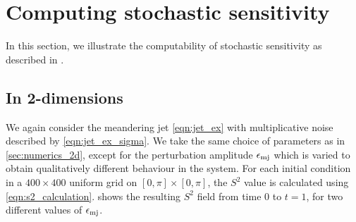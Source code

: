 \section{Computing stochastic sensitivity} \label{sec:comput_s2}
In this section, we illustrate the computability of stochastic sensitivity as described in .

\subsection{In 2-dimensions}
We again consider the meandering jet \cref{eqn:jet_ex} with multiplicative noise described by \cref{eqn:jet_ex_sigma}.
We take the same choice of parameters as in \cref{sec:numerics_2d}, except for the perturbation amplitude \(\epsilon_{\mathrm{mj}}\) which is varied to obtain qualitatively different behaviour in the system.
For each initial condition in a \(400 \times 400\) uniform grid on \(\left[0, \pi\right] \times \left[0, \pi\right]\), the \(S^2\) value is calculated using \cref{eqn:s2_calculation}.
 shows the resulting \(S^2\) field from time \(0\) to \(t = 1\), for two different values of \(\epsilon_{\mathrm{mj}}\).

